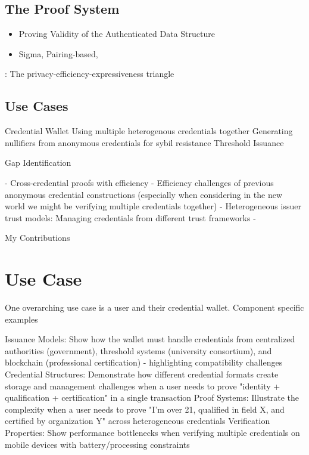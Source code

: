 \subsection{The Proof System}
\begin{itemize}
    \item Proving Validity of the Authenticated Data Structure
    \item Sigma, Pairing-based, 
\end{itemize}

: The privacy-efficiency-expressiveness triangle


\subsection{Use Cases}

Credential Wallet
Using multiple heterogenous credentials together
Generating nullifiers from anonymous credentials for sybil resistance
Threshold Issuance

Gap Identification

- Cross-credential proofs with efficiency
- Efficiency challenges of previous anonymous credential constructions (especially when considering in the new world we might be verifying multiple credentials together)
- Heterogeneous issuer trust models: Managing credentials from different trust frameworks
- 


My Contributions

















\section{Use Case}
One overarching use case is a user and their credential wallet.
Component specific examples

Issuance Models: Show how the wallet must handle credentials from centralized authorities (government), threshold systems (university consortium), and blockchain (professional certification) - highlighting compatibility challenges
Credential Structures: Demonstrate how different credential formats create storage and management challenges when a user needs to prove "identity + qualification + certification" in a single transaction
Proof Systems: Illustrate the complexity when a user needs to prove "I'm over 21, qualified in field X, and certified by organization Y" across heterogeneous credentials
Verification Properties: Show performance bottlenecks when verifying multiple credentials on mobile devices with battery/processing constraints

